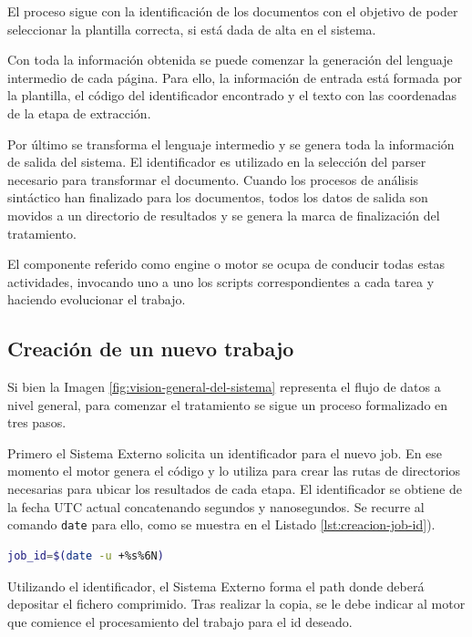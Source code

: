 El proceso sigue con la identificación de los documentos con el objetivo de poder seleccionar la plantilla correcta, si está dada de alta en el sistema. 

Con toda la información obtenida se puede comenzar la generación del lenguaje intermedio de cada página. Para ello, la información de entrada está formada por la plantilla, el código del identificador encontrado y el texto con las coordenadas de la etapa de extracción.

Por último se transforma el lenguaje intermedio y se genera toda la información de salida del sistema. El identificador es utilizado en la  selección del parser necesario para transformar el documento. Cuando los procesos de análisis sintáctico han finalizado para los documentos, todos los datos de salida son movidos a un directorio de resultados y se genera la marca de finalización del tratamiento.

El componente referido como engine o motor se ocupa de conducir todas estas actividades, invocando uno a uno los scripts correspondientes a cada tarea y haciendo evolucionar el trabajo.

\subsection{Creación de un nuevo trabajo}

Si bien la Imagen \ref{fig:vision-general-del-sistema} representa el flujo de datos a nivel general, para comenzar el tratamiento se sigue un proceso formalizado en tres pasos. 

Primero el Sistema Externo solicita un identificador para el nuevo job. En ese momento el motor genera el código y lo utiliza para crear las rutas de directorios necesarias para ubicar los resultados de cada etapa. El identificador se obtiene de la fecha UTC actual concatenando segundos y nanosegundos. Se recurre al comando \verb|date| para ello, como se muestra en el Listado \ref{lst:creacion-job-id}).

\begin{lstlisting}[language=bash,caption={Obtención del identificador de un trabajo.},label=lst:creacion-job-id]
job_id=$(date -u +%s%6N)
\end{lstlisting}

Utilizando el identificador, el Sistema Externo forma el path donde deberá depositar el fichero comprimido. Tras realizar la copia, se le debe indicar al motor que comience el procesamiento del trabajo para el id deseado.

